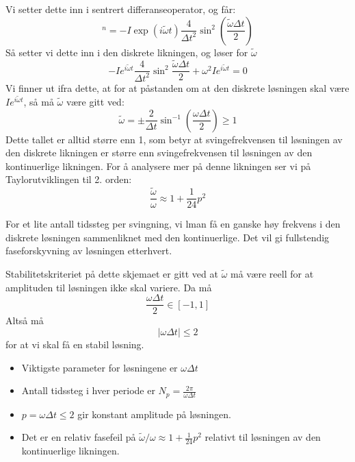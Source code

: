 \documentclass[a4paper, 10pt]{article}
\begin{document}
Vi setter dette inn i sentrert differanseoperator, og får:
\begin{equation}
	[D_t D_t u]^n = -I\exp{(i\tilde\omega t)}\frac{4}{\Delta t^2}\sin^2(\frac{\tilde\omega\Delta t}{2})
\end{equation}
Så setter vi dette inn i den diskrete likningen, og løser for  $\tilde{\omega}$
\begin{equation}
	-I e^{i\tilde{\omega}t}\frac{4}{\Delta t^2}\sin^2{\frac{\tilde{\omega}\Delta t}{2}} + \omega^2 Ie^{i\tilde{\omega}t} = 0
\end{equation}
Vi finner ut ifra dette, at for at påstanden om at den diskrete løsningen skal være $I e^{i\tilde{\omega}t}$, så må $\tilde{\omega}$ være gitt ved:
\begin{equation}
	\tilde{\omega} = \pm \frac{2}{\Delta t} \sin^{-1} \left(\frac{\omega\Delta t}{2}\right) \geq 1
\end{equation}
Dette tallet er alltid større enn 1, som betyr at svingefrekvensen til løsningen av den diskrete likningen er større enn svingefrekvensen til løsningen av den kontinuerlige likningen. For å analysere mer på denne likningen ser vi på Taylorutviklingen til 2. orden:
\begin{equation}
	\frac{\tilde\omega}{\omega} \approx 1 + \frac{1}{24}p^2
\end{equation}

For et lite antall tidssteg per svingning, vi lman få en ganske høy frekvens i den diskrete løsningen sammenliknet med den kontinuerlige. Det vil gi fullstendig faseforskyvning av løsningen etterhvert.

Stabilitetskriteriet på dette skjemaet er gitt ved at $\tilde{\omega}$ må være reell for at amplituden til løsningen ikke skal variere. Da må
\begin{equation}
	\frac{\omega\Delta t}{2} \in [-1, 1]
\end{equation}
Altså må
\begin{equation}
	|\omega \Delta t| \leq 2
\end{equation}
for at vi skal få en stabil løsning.

\begin{itemize}
\item Viktigste parameter for løsningene er $\omega \Delta t$
\item Antall tidssteg i hver periode er $N_p = \frac{2\pi }{\omega \Delta t}$
\item $p=\omega \Delta t \leq 2$ gir konstant amplitude på løsningen.
\item Det er en relativ fasefeil på $\tilde{\omega}/\omega \approx 1 + \frac{1}{24}p^2$ relativt til løsningen av den kontinuerlige likningen.  
\end{itemize}
\end{document}
